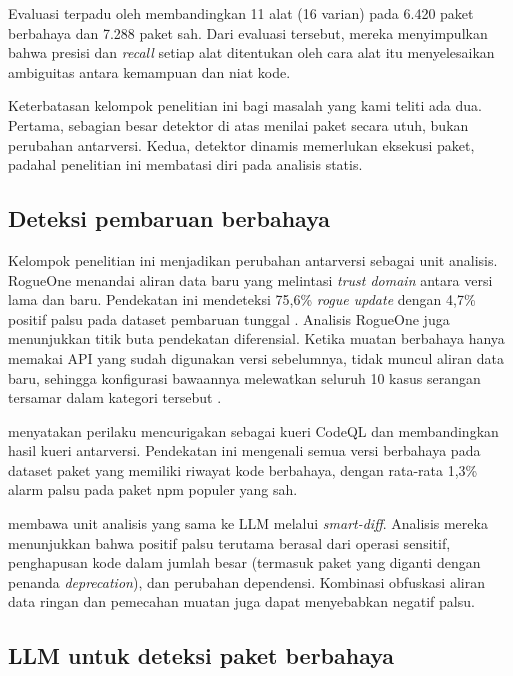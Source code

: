 \documentclass[a4paper,fleqn]{cas-dc}
\begin{document}
Evaluasi terpadu oleh \citet{guo2026effective} membandingkan 11 alat (16 varian)
pada 6.420 paket berbahaya dan 7.288 paket sah. Dari evaluasi tersebut, mereka
menyimpulkan bahwa presisi dan \emph{recall} setiap alat ditentukan oleh cara
alat itu menyelesaikan ambiguitas antara kemampuan dan niat kode.

Keterbatasan kelompok penelitian ini bagi masalah yang kami teliti ada dua.
Pertama, sebagian besar detektor di atas menilai paket secara utuh, bukan
perubahan antarversi. Kedua, detektor dinamis memerlukan eksekusi paket, padahal
penelitian ini membatasi diri pada analisis statis.

\subsection{Deteksi pembaruan berbahaya}

Kelompok penelitian ini menjadikan perubahan antarversi sebagai unit analisis.
RogueOne menandai aliran data baru yang melintasi \emph{trust domain} antara
versi lama dan baru. Pendekatan ini mendeteksi 75,6\% \emph{rogue update} dengan
4,7\% positif palsu pada dataset pembaruan tunggal \citep{sofaer2024rogueone}.
Analisis RogueOne juga menunjukkan titik buta pendekatan diferensial. Ketika
muatan berbahaya hanya memakai API yang sudah digunakan versi sebelumnya, tidak
muncul aliran data baru, sehingga konfigurasi bawaannya melewatkan seluruh 10
kasus serangan tersamar dalam kategori tersebut \citep{sofaer2024rogueone}.

\citet{froh2023differential} menyatakan perilaku mencurigakan sebagai kueri
CodeQL dan membandingkan hasil kueri antarversi. Pendekatan ini mengenali semua
versi berbahaya pada dataset paket yang memiliki riwayat kode berbahaya, dengan
rata-rata 1,3\% alarm palsu pada paket npm populer yang sah.

\citet{wyss2025evaluating} membawa unit analisis yang sama ke LLM melalui
\emph{smart-diff}. Analisis mereka menunjukkan bahwa positif palsu terutama
berasal dari operasi sensitif, penghapusan kode dalam jumlah besar (termasuk
paket yang diganti dengan penanda \emph{deprecation}), dan perubahan dependensi.
Kombinasi obfuskasi aliran data ringan dan pemecahan muatan juga dapat
menyebabkan negatif palsu.

\subsection{LLM untuk deteksi paket berbahaya}
\end{document}
